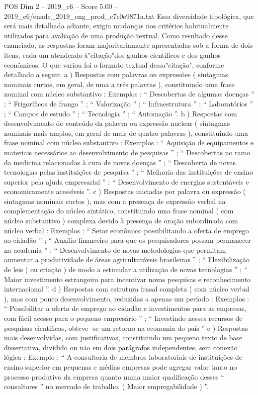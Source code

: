 \begin{textsample}{POS Dim 2 – 2019\_c6 – Score 5.00 – 2019\_c6/enade\_2019\_eng\_prod\_c7c0e9871a.txt}
Essa diversidade tipológica, que será mais detalhada adiante, exigiu mudanças nos critérios habitualmente utilizados para avaliação de uma produção textual.
Como resultado desse enunciado, as respostas foram majoritariamente apresentadas sob a forma de dois itens, cada um atendendo à"citação"dos ganhos científicos e dos ganhos econômicos.
O que variou foi o formato textual dessa"citação", conforme detalhado a seguir. a ) Respostas com palavras ou expressões ( sintagmas nominais curtos, em geral, de uma a três palavras ), constituindo uma frase nominal com núcleo substantivo : Exemplos : “ Descobertas de algumas doenças ” ; “ Frigoríficos de frango ” ; “ Valorização ” ; “ Infraestrutura ” ; “ Laboratórios ” ; “ Campos de estudo ” ; “ Tecnologia ” ; “ Automação ”. b ) Respostas com desenvolvimento do conteúdo da palavra ou expressão nuclear ( sintagmas nominais mais amplos, em geral de mais de quatro palavras ), constituindo uma frase nominal com núcleo substantivo : Exemplos : “ Aquisição de equipamentos e materiais necessários ao desenvolvimento de pesquisas ” ; “ Descobertas no ramo da medicina relacionadas à cura de novas doenças ” ; “ Descoberta de novas tecnologias pelas instituições de pesquisa ” ; “ Melhoria das instituições de ensino superior pela ajuda empresarial ” ; “ Desenvolvimento de energias sustentáveis e economicamente acessíveis ”. c ) Respostas iniciadas por palavra ou expressão ( sintagmas nominais curtos ), mas com a presença de expressão verbal na complementação do núcleo sintático, constituindo uma frase nominal ( com núcleo substantivo ) complexa devido à presença de oração subordinada com núcleo verbal : Exemplos : “ Setor econômico possibilitando a oferta de emprego ao cidadão ” ; “ Auxílio financeiro para que os pesquisadores possam permanecer na academia ” ; “ Desenvolvimento de novas metodologias que permitam aumentar a produtividade de áreas agriculturáveis brasileiras ” ; “ Flexibilização de leis ( ou criação ) de modo a estimular a utilização de novas tecnologias ” ; “ Maior investimento estrangeiro para incentivar novas pesquisas e reconhecimento internacional ”. d ) Respostas com estrutura frasal completa ( com núcleo verbal ), mas com pouco desenvolvimento, reduzidas a apenas um período : Exemplos : “ Possibilitar a oferta de emprego ao cidadão e investimentos para as empresas, com fácil acesso para o pequeno empresário ” ; “ Investindo nesses recursos de pesquisas cientificas, obteve -se um retorno na economia do país ” e ) Respostas mais desenvolvidas, com justificativas, constituindo um pequeno texto de base dissertativa, dividido ou não em dois parágrafos independentes, sem conexão lógica : Exemplo : “ A consultoria de membros laboratoriais de instituições de ensino superior em pequenas e médias empresas pode agregar valor tanto no processo produtivo da empresa quanto numa maior qualificação desses “ consultores ” no mercado de trabalho. ( Maior empregabilidade ) ”.

\end{textsample}
